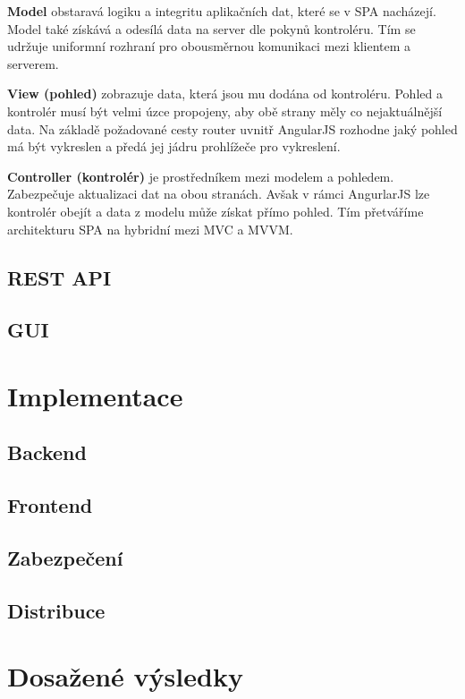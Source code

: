 \begin{description}
    \item {\bf Model} obstaravá logiku a integritu aplikačních dat, které se v SPA nacházejí. Model také získává a odesílá data na server dle pokynů kontroléru. Tím se udržuje uniformní rozhraní pro obousměrnou komunikaci mezi klientem a serverem.
    \item {\bf View (pohled)} zobrazuje data, která jsou mu dodána od kontroléru. Pohled a kontrolér musí být velmi úzce propojeny, aby obě strany měly co nejaktuálnější data. Na základě požadované cesty router uvnitř AngularJS rozhodne jaký pohled má být vykreslen a předá jej jádru prohlížeče pro vykreslení.
    \item {\bf Controller (kontrolér)} je prostředníkem mezi modelem a pohledem. Zabezpečuje aktualizaci dat na obou stranách. Avšak v rámci AngurlarJS lze kontrolér obejít a data z modelu může získat přímo pohled. Tím přetváříme architekturu SPA na hybridní mezi MVC a MVVM.
\end{description}

\section{REST API}
\label{restapi}

\section{GUI}

\chapter{Implementace}
\section{Backend}
\section{Frontend}
\section{Zabezpečení}
\section{Distribuce}

\chapter{Dosažené výsledky}

